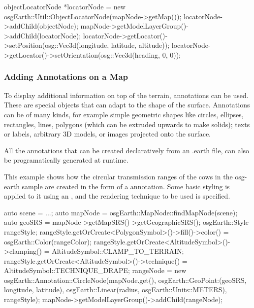 \begin{cpp}
objectLocatorNode *locatorNode =
    new osgEarth::Util::ObjectLocatorNode(mapNode->getMap());
locatorNode->addChild(objectNode);
mapNode->getModelLayerGroup()->addChild(locatorNode);
locatorNode->getLocator()->setPosition(osg::Vec3d(longitude, latitude, altitude));
locatorNode->getLocator()->setOrientation(osg::Vec3d(heading, 0, 0));
\end{cpp}

\subsubsection{Adding Annotations on a Map}
\label{sec:graphics:osgearth-adding-annotations}

To display additional information on top of the terrain, annotations can be
used. These are special objects that can adapt to the shape of the surface.
Annotations can be of many kinds, for example simple geometric shapes like circles,
ellipses, rectangles, lines, polygons (which can be extruded upwards to make
solids); texts or labels, arbitrary 3D models, or images projected onto the
surface.

All the annotations that can be created declaratively from an .earth file,
can also be programatically generated at runtime.

This example shows how the circular transmission ranges of the cows in the
osg-earth sample are created in the form of a
 annotation. Some basic styling is
applied to it using an , and the rendering technique to
be used is specified.

\begin{cpp}
auto scene = ...;
auto mapNode = osgEarth::MapNode::findMapNode(scene);
auto geoSRS = mapNode->getMapSRS()->getGeographicSRS();
osgEarth::Style rangeStyle;
rangeStyle.getOrCreate<PolygonSymbol>()->fill()->color() =
                                        osgEarth::Color(rangeColor);
rangeStyle.getOrCreate<AltitudeSymbol>()->clamping() =
                                        AltitudeSymbol::CLAMP_TO_TERRAIN;
rangeStyle.getOrCreate<AltitudeSymbol>()->technique() =
                                        AltitudeSymbol::TECHNIQUE_DRAPE;
rangeNode = new osgEarth::Annotation::CircleNode(mapNode.get(),
    osgEarth::GeoPoint:(geoSRS, longitude, latitude),
    osgEarth::Linear(radius, osgEarth::Units::METERS), rangeStyle);
mapNode->getModelLayerGroup()->addChild(rangeNode);
\end{cpp}


